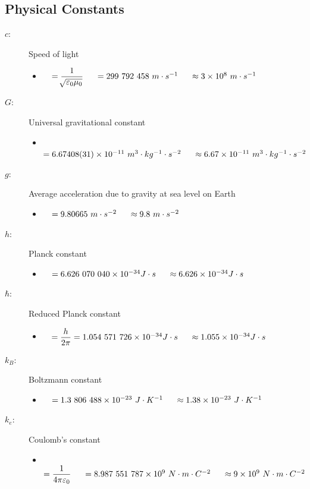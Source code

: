 \documentclass[]{report}
\newcommand \tab[1][1cm]{\hspace*{#1}}
\newcommand{\items}{\item\ \ }
\begin{document}
\subsection{Physical Constants}	
\begin{description}

\item[$c$:] Speed of light
\begin{itemize}
\items $ = \dfrac{1}{\sqrt[]{\varepsilon_0 \mu_0}} \tab[0.5cm] = 299\ 792\ 458\ m\cdot s^{-1} \tab[0.5cm]\approx 3 \times 10^{8} \ m\cdot s^{-1}$
\end{itemize}			

\item[$G$:] Universal gravitational constant
\begin{itemize}
\items $ = 6.67408(31) \times 10^{-11} \ m^3\cdot kg^{-1}\cdot s^{-2} \tab[0.5cm]\approx 6.67 \times 10^{-11} \ m^3\cdot kg^{-1}\cdot s^{-2}$
\end{itemize}			

\item[$g$:] Average acceleration due to gravity at sea level on Earth
\begin{itemize}
\items $ = 9.80665 \ m \cdot s^{-2} \tab[0.5cm]\approx 9.8 \ m \cdot s^{-2}$
\end{itemize}			

\item[$h$:] Planck constant
\begin{itemize}
\items $ = 6.626\ 070\ 040\times 10^{-34} J\cdot s \tab[0.5cm]\approx 6.626\times 10^{-34} J\cdot s  $
\end{itemize}			

\item[$\hbar$:] Reduced Planck constant
\begin{itemize}
\items $ = \dfrac{h}{2\pi} = 1.054\ 571\ 726\times 10^{-34} J\cdot s \tab[0.5cm]\approx 1.055\times 10^{-34} J\cdot s  $
\end{itemize}			

\item[$k_B$:] Boltzmann constant
\begin{itemize}
\items $ = 1.3\ 806\ 488\times 10^{-23} \ J\cdot K^{-1} \tab[0.5cm] \approx 1.38\times 10^{-23}\ J\cdot K^{-1}$
\end{itemize}			

\item[$k_e$:] Coulomb's constant
\begin{itemize}
\items $ = \dfrac{1}{4\pi \varepsilon_0}\tab[0.5cm] = 8.987\ 551\ 787\times 10^{9} \ N\cdot m \cdot C^{-2} \tab[0.5cm] \approx 9\times 10^{9}\ N\cdot m \cdot C^{-2}$
\end{itemize}


\end{description}
\end{document}
